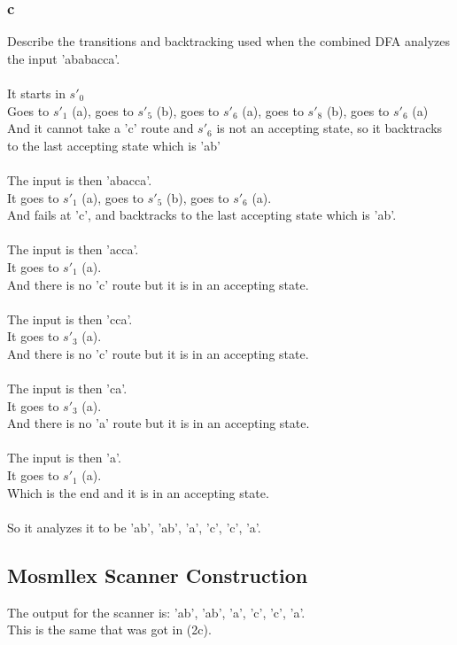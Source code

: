 \documentclass[12pt]{article}
\begin{document}
\subsubsection*{c}
Describe the transitions and backtracking used when the combined DFA analyzes the input 'ababacca'.\\
\\
It starts in $s'_0$\\
Goes to $s'_1$ (a), goes to $s'_5$ (b), goes to $s'_6$ (a), goes to $s'_8$ (b), goes to $s'_6$ (a)\\
And it cannot take a 'c' route and $s'_6$ is not an accepting state, so it backtracks to the last accepting state which is 'ab'\\
\\
The input is then 'abacca'.\\
It goes to $s'_1$ (a), goes to $s'_5$ (b), goes to $s'_6$ (a).\\
And fails at 'c', and backtracks to the last accepting state which is 'ab'.\\
\\
The input is then 'acca'.\\
It goes to $s'_1$ (a).\\
And there is no 'c' route but it is in an accepting state.\\
\\
The input is then 'cca'.\\
It goes to $s'_3$ (a).\\
And there is no 'c' route but it is in an accepting state.\\
\\
The input is then 'ca'.\\
It goes to $s'_3$ (a).\\
And there is no 'a' route but it is in an accepting state.\\
\\
The input is then 'a'.\\
It goes to $s'_1$ (a).\\
Which is the end and it is in an accepting state.\\
\\
So it analyzes it to be 'ab', 'ab', 'a', 'c', 'c', 'a'. 

\newpage

\subsection*{Mosmllex Scanner Construction}
The output for the scanner is: 'ab', 'ab', 'a', 'c', 'c', 'a'.\\
This is the same that was got in (2c).
\end{document}
